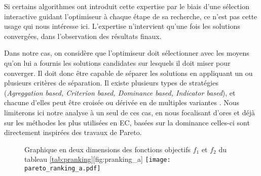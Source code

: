 Si certains algorithmes ont introduit cette expertise par le biais d'une sélection interactive guidant l'optimiseur à chaque étape de sa recherche, ce n'est pas cette usage qui nous intéresse ici. L'expertise n'intervient qu'une fois les solutions convergées, dans l'observation des résultats finaux.

Dans notre cas, on considère que l'optimiseur doit sélectionner avec les moyens qu'on lui a fournis les solutions candidates sur lesquels il doit miser pour converger. Il doit donc être capable de séparer les solutions en appliquant un ou plusieurs critères de séparation. Il existe plusieurs types de stratégies (\textit{Agreggation based, Criterion based, Dominance based, Indicator based}), et chacune d'elles peut être croisée ou dérivée en de multiples variantes \autocites[28]{Zitzler1999a, Deb2001}[7]{Liefooghe2009}. Nous limiterons ici notre analyse à un seul de ces cas, en nous focalisant d'ores et déjà sur les méthodes les plus utilisées en EC, basées sur la dominance celles-ci sont directement inspirées des travaux de Pareto.


\begin{figure}[!htbp]
	\begin{sidecaption}[fortoc]{Graphique en deux dimensions des fonctions objectifs $f_1$ et $f_2$ du tableau \ref{tab:pranking}}[fig:pranking_a]
		\centering
		\texttt{[image: pareto\_ranking\_a.pdf]}
	 \end{sidecaption}
\end{figure}

